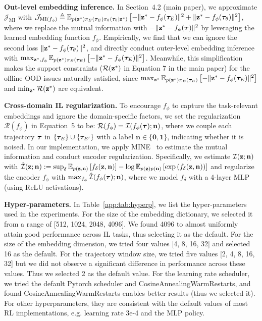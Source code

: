 \textbf{Out-level embedding inference.} In Section~4.2 (main paper), we approximate $\mathcal{J}_{\text{MI}}$ with $\mathcal{J}_{\text{MI}(f_\phi)} \triangleq \mathbb{E}_{p({\mathbf{z}}^*)\pi_E({\bm{\tau}}_E)\pi_\theta({\bm{\tau}}_\theta|{\mathbf{z}}^*)} \left[ - \Vert{\mathbf{z}}^*-f_\phi({\bm{\tau}}_E)\Vert^2 + \Vert{\mathbf{z}}^*-f_\phi({\bm{\tau}}_\theta)\Vert^2 \right]$, where we replace the mutual information with $- \Vert{\mathbf{z}}^*-f_\phi({\bm{\tau}})\Vert^2$ by leveraging the learned embedding function $f_\phi$. Empirically, we find that we can ignore the second loss $\Vert{\mathbf{z}}^*-f_\phi({\bm{\tau}}_\theta)\Vert^2$, and directly conduct outer-level embedding inference with $\max_{{\mathbf{z}}^*, f_\phi} \mathbb{E}_{p({\mathbf{z}}^*)\pi_E({\bm{\tau}}_E)} \left[ - \Vert{\mathbf{z}}^*-f_\phi({\bm{\tau}}_E)\Vert^2 \right]$. Meanwhile, this simplification makes the support constraints ($\mathcal{R}({\mathbf{z}}^*)$ in Equation 7 in the main paper) for the offline OOD issues naturally satisfied, since $\max_{{\mathbf{z}}^*} \mathbb{E}_{p({\mathbf{z}}^*)\pi_E({\bm{\tau}}_E)} \left[ - \Vert{\mathbf{z}}^*-f_\phi({\bm{\tau}}_E)\Vert^2 \right]$ and $\min_{{\mathbf{z}}^*} \mathcal{R}({\mathbf{z}}^*)$ are equivalent. 


\textbf{Cross-domain IL regularization.}  
To encourage $f_\phi$ to capture the task-relevant embeddings and ignore the domain-specific factors, we set the regularization $\mathcal{R}(f_\phi)$ in Equation~5 to be:
$\mathcal{R}(f_\phi)  = \mathcal{I}(f_\phi({\bm{\tau}}); \mathbf{n})$, where we couple each trajectory ${\bm{\tau}}$ in $\{{\bm{\tau}}_{E}\}\cup\{{\bm{\tau}}_{E'}\}$ with a label $\mathbf{n} \in \{\mathbf{0}, \mathbf{1}\}$, indicating whether it is noised. 
In our implementation, we apply MINE~\citep{belghazi2018mine} to estimate the mutual information and conduct encoder regularization. Specifically, we estimate $\mathcal{I}({\mathbf{z}}; {\mathbf{n}})$ with $\hat{\mathcal{I}}({\mathbf{z}}; {\mathbf{n}}) := \sup_\delta \mathbb{E}_{p({\mathbf{z}}, {\mathbf{n}})} \left[f_\delta({\mathbf{z}}, {\mathbf{n}})\right] - \log \mathbb{E}_{p({\mathbf{z}})p({\mathbf{n}})} \left[\exp{(f_\delta({\mathbf{z}}, {\mathbf{n}}))}\right]$ and regularize the encoder $f_\phi$ with $\max_{f_\phi} \hat{\mathcal{I}}(f_\phi({\bm{\tau}}); \mathbf{n})$, where we model $f_\delta$ with a 4-layer MLP (using ReLU activations). 


\textbf{Hyper-parameters.} 
In Table~\ref{app:tab:hyperp}, we list the hyper-parameters used in the experiments. 
For the size of the embedding dictionary, we selected it from a range of [512, 1024, 2048, 4096]. We found 4096 to almost uniformly attain good performance across IL tasks, thus selecting it as the default. For the size of the embedding dimension, we tried four values [4, 8, 16, 32] and selected 16 as the default. For the trajectory window size, we tried five values [2, 4, 8, 16, 32] but we did not observe a significant difference in performance across these values. Thus we selected 2 as the default value. For the learning rate scheduler, we tried the default Pytorch scheduler and CosineAnnealingWarmRestarts, and found CosineAnnealingWarmRestarts enables better results (thus we selected it). For other hyperparameters, they are consistent with the default values of most RL implementations, e.g. learning rate 3e-4 and the MLP policy. 


